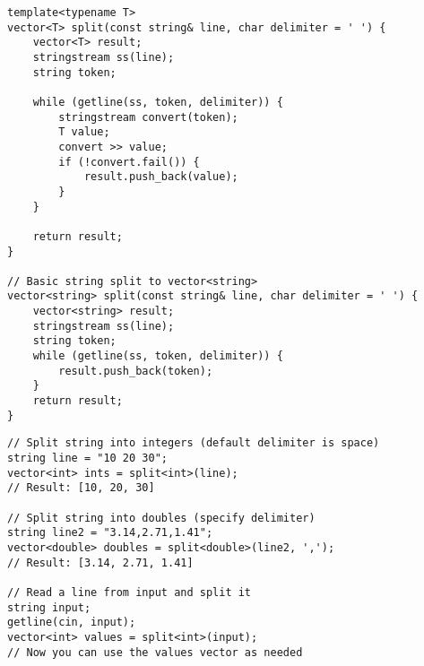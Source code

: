 \documentclass[11pt,a4paper]{article}
\begin{document}
\newpage
\begin{lstlisting}[caption={String Split Utility}]
template<typename T>
vector<T> split(const string& line, char delimiter = ' ') {
    vector<T> result;
    stringstream ss(line);
    string token;

    while (getline(ss, token, delimiter)) {
        stringstream convert(token);
        T value;
        convert >> value;
        if (!convert.fail()) {
            result.push_back(value);
        }
    }

    return result;
}

// Basic string split to vector<string>
vector<string> split(const string& line, char delimiter = ' ') {
    vector<string> result;
    stringstream ss(line);
    string token;
    while (getline(ss, token, delimiter)) {
        result.push_back(token);
    }
    return result;
}
\end{lstlisting}

\begin{lstlisting}[caption={String Split Examples}]
// Split string into integers (default delimiter is space)
string line = "10 20 30";
vector<int> ints = split<int>(line);
// Result: [10, 20, 30]

// Split string into doubles (specify delimiter)
string line2 = "3.14,2.71,1.41";
vector<double> doubles = split<double>(line2, ',');
// Result: [3.14, 2.71, 1.41]

// Read a line from input and split it
string input;
getline(cin, input);
vector<int> values = split<int>(input);
// Now you can use the values vector as needed
\end{lstlisting}
\end{document}
